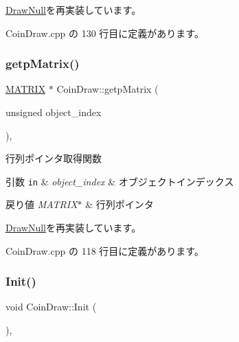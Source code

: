 \mbox{\hyperlink{class_draw_null_a0c1efe55fea325ad277594be6fe1e938}{Draw\+Null}}を再実装しています。



 Coin\+Draw.\+cpp の 130 行目に定義があります。

\mbox{\label{class_coin_draw_ad8cbbe87f4cf4428214f50492c731f5f}} 
\subsubsection{\texorpdfstring{getp\+Matrix()}{getpMatrix()}}
{\footnotesize\ttfamily \mbox{\hyperlink{_vector3_d_8h_a032295cd9fb1b711757c90667278e744}{M\+A\+T\+R\+IX}} $\ast$ Coin\+Draw\+::getp\+Matrix (\begin{DoxyParamCaption}\item[{unsigned}]{object\+\_\+index }\end{DoxyParamCaption})\hspace{0.3cm}{\ttfamily [override]}, {\ttfamily [virtual]}}



行列ポインタ取得関数 


\begin{DoxyParams}[1]{引数}
\mbox{\tt in}  & {\em object\+\_\+index} & オブジェクトインデックス \\
\hline
\end{DoxyParams}

\begin{DoxyRetVals}{戻り値}
{\em M\+A\+T\+R\+I\+X$\ast$} & 行列ポインタ \\
\hline
\end{DoxyRetVals}


\mbox{\hyperlink{class_draw_null_a9aac059eb3b5d1f77e8bd3aa0647cff9}{Draw\+Null}}を再実装しています。



 Coin\+Draw.\+cpp の 118 行目に定義があります。

\mbox{\label{class_coin_draw_ad0f5da5cfb896541fd59b1ab4a8593d1}} 
\subsubsection{\texorpdfstring{Init()}{Init()}}
{\footnotesize\ttfamily void Coin\+Draw\+::\+Init (\begin{DoxyParamCaption}{ }\end{DoxyParamCaption})\hspace{0.3cm}{\ttfamily [override]}, {\ttfamily [virtual]}}




